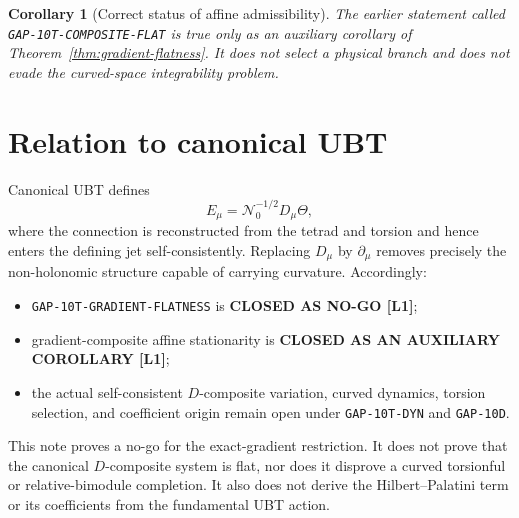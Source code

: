 \documentclass[11pt,a4paper]{article}
\newtheorem{corollary}{Corollary}
\begin{document}
\begin{corollary}[Correct status of affine admissibility]
The earlier statement called \texttt{GAP-10T-COMPOSITE-FLAT} is true only as
an auxiliary corollary of Theorem~\ref{thm:gradient-flatness}.  It does not
select a physical branch and does not evade the curved-space integrability
problem.
\end{corollary}

\section{Relation to canonical UBT}
Canonical UBT defines
\begin{equation}
 E_\mu=\mathcal N_0^{-1/2}D_\mu\Theta,
\end{equation}
where the connection is reconstructed from the tetrad and torsion and hence
enters the defining jet self-consistently.  Replacing $D_\mu$ by $\partial_\mu$
removes precisely the non-holonomic structure capable of carrying curvature.
Accordingly:
\begin{itemize}
 \item \texttt{GAP-10T-GRADIENT-FLATNESS} is \textbf{CLOSED AS NO-GO [L1]};
 \item gradient-composite affine stationarity is \textbf{CLOSED AS AN
       AUXILIARY COROLLARY [L1]};
 \item the actual self-consistent $D$-composite variation, curved dynamics,
       torsion selection, and coefficient origin remain open under
       \texttt{GAP-10T-DYN} and \texttt{GAP-10D}.
\end{itemize}

\begin{tcolorbox}[colback=orange!6!white,colframe=orange!70!black,title=Scope
and non-claims]
This note proves a no-go for the exact-gradient restriction.  It does not
prove that the canonical $D$-composite system is flat, nor does it disprove a
curved torsionful or relative-bimodule completion.  It also does not derive
the Hilbert--Palatini term or its coefficients from the fundamental UBT
action.
\end{tcolorbox}
\end{document}
